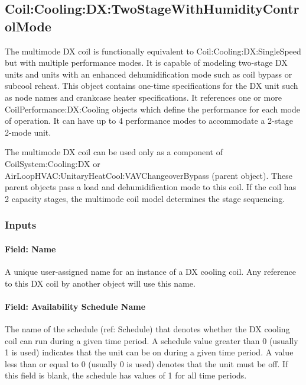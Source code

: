 \subsection{Coil:Cooling:DX:TwoStageWithHumidityControlMode}\label{coilcoolingdxtwostagewithhumiditycontrolmode}

The multimode DX coil is functionally equivalent to Coil:Cooling:DX:SingleSpeed but with multiple performance modes. It is capable of modeling two-stage DX units and units with an enhanced dehumidification mode such as coil bypass or subcool reheat. This object contains one-time specifications for the DX unit such as node names and crankcase heater specifications. It references one or more CoilPerformance:DX:Cooling objects which define the performance for each mode of operation. It can have up to 4 performance modes to accommodate a 2-stage 2-mode unit.

The multimode DX coil can be used only as a component of CoilSystem:Cooling:DX or AirLoopHVAC:UnitaryHeatCool:VAVChangeoverBypass (parent object). These parent objects pass a load and dehumidification mode to this coil. If the coil has 2 capacity stages, the multimode coil model determines the stage sequencing.

\subsubsection{Inputs}\label{inputs-15-004}

\paragraph{Field: Name}\label{field-name-14-002}

A unique user-assigned name for an instance of a DX cooling coil. Any reference to this DX coil by another object will use this name.

\paragraph{Field: Availability Schedule Name}\label{field-availability-schedule-name-8-001}

The name of the schedule (ref: Schedule) that denotes whether the DX cooling coil can run during a given time period. A schedule value greater than 0 (usually 1 is used) indicates that the unit can be on during a given time period. A value less than or equal to 0 (usually 0 is used) denotes that the unit must be off. If this field is blank, the schedule has values of 1 for all time periods.

